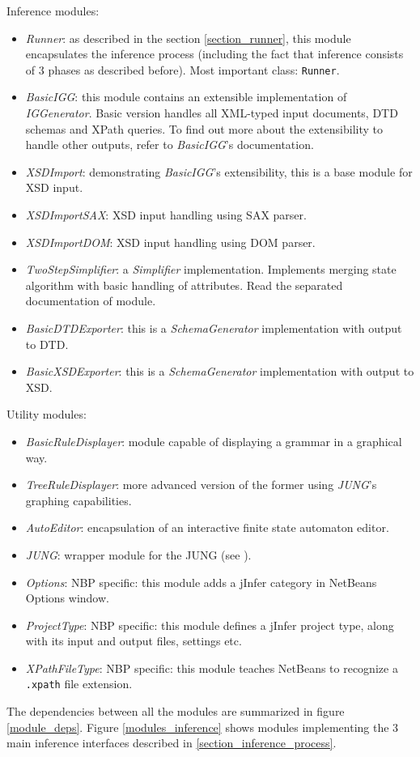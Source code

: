 \documentclass[a4paper,10pt,oneside]{article}
\newcommand{\code}[1]{\texttt{#1}}
\newcommand{\jmodule}[1]{\emph{#1}}
\begin{document}
\noindent Inference modules:
\begin{itemize}
	\item \jmodule{Runner}: as described in the section \ref{section_runner}, this module encapsulates the inference process (including the fact that inference consists of 3 phases as described before). Most important class: \code{Runner}.
	\item \jmodule{BasicIGG}: this module contains an extensible implementation of \jmodule{IGGenerator}. Basic version handles all XML-typed input documents, DTD schemas and XPath queries. To find out more about the extensibility to handle other outputs, refer to \jmodule{BasicIGG}'s documentation.
	\item \jmodule{XSDImport}: demonstrating \jmodule{BasicIGG}'s extensibility, this is a base module for XSD input.
	\item \jmodule{XSDImportSAX}: XSD input handling using SAX parser.
	\item \jmodule{XSDImportDOM}: XSD input handling using DOM parser.
	\item \jmodule{TwoStepSimplifier}: a \jmodule{Simplifier} implementation. Implements \cite{ahonen} merging state algorithm with basic handling of attributes. Read the separated documentation of module.
	\item \jmodule{BasicDTDExporter}: this is a \jmodule{SchemaGenerator} implementation with output to DTD.
	\item \jmodule{BasicXSDExporter}: this is a \jmodule{SchemaGenerator} implementation with output to XSD.
\end{itemize}

\noindent Utility modules:
\begin{itemize}
	\item \jmodule{BasicRuleDisplayer}: module capable of displaying a grammar in a graphical way.
	\item \jmodule{TreeRuleDisplayer}: more advanced version of the former using \jmodule{JUNG}'s graphing capabilities.
	\item \jmodule{AutoEditor}: encapsulation of an interactive finite state automaton editor.
	\item \jmodule{JUNG}: wrapper module for the JUNG (see \cite{jung}).
	\item \jmodule{Options}: NBP specific: this module adds a jInfer category in NetBeans Options window.
	\item \jmodule{ProjectType}: NBP specific: this module defines a jInfer project type, along with its input and output files, settings etc.
	\item \jmodule{XPathFileType}: NBP specific: this module teaches NetBeans to recognize a \code{.xpath} file extension.
\end{itemize}
The dependencies between all the modules are summarized in figure \ref{module_deps}. Figure \ref{modules_inference} shows modules implementing the 3 main inference interfaces described in \ref{section_inference_process}.
\end{document}
